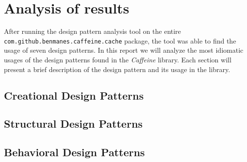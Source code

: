 \section{Analysis of results}

After running the design pattern analysis tool on the entire \texttt{com.github.benmanes.caffeine.cache} package, the tool was able to find the usage of seven design patterns. In this report we will analyze the most idiomatic usages of the design patterns found in the \textit{Caffeine} library. Each section will present a brief description of the design pattern and its usage in the library.

\subsection{Creational Design Patterns}



\subsection{Structural Design Patterns}



\subsection{Behavioral Design Patterns}



